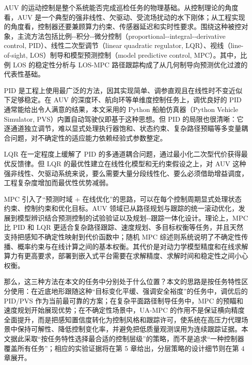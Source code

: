 AUV 的运动控制是整个系统能否完成巡检任务的物理基础。从控制理论的角度看，AUV 是一个典型的强非线性、欠驱动、受流场扰动的水下刚体；从工程实现的角度看，控制器还要兼顾算力约束、传感器延迟和实时性要求。围绕这种被控对象，主流方法包括比例-\/-积分-\/-微分控制（proportional-\/-integral-\/-derivative control, PID）、线性二次型调节（linear quadratic regulator, LQR）、视线（line-of-sight, LOS）制导和模型预测控制（model predictive control, MPC）。其中，比例 LOS 的稳定性分析\cite{fossen2014usges}与 LOS-MPC 路径跟踪\cite{oh2010path}构成了从几何制导向预测优化过渡的代表性基础。

PID 是工程上使用最广泛的方法，因其实现简单、调参直观且在线性时不变近似下足够稳定。在 AUV 的深度环、航向环等单维度控制任务上，调优良好的 PID 通常能给出令人满意的结果，本文采用的 Python 船舶仿真器（Python Vehicle Simulator, PVS）内置自动驾驶仪即基于这种思想。但 PID 的局限也很清晰：它逐通道独立调节，难以显式处理执行器饱和、状态约束、复杂路径预瞄等多变量耦合问题，对不确定性的适应能力依赖经验式参数整定。

LQR 在一定程度上缓解了 PID 的多通道耦合问题，通过最小化二次型代价获得最优反馈律。但 LQR 的最优性建立在线性化模型和无约束假设之上，对 AUV 这种强非线性、欠驱动系统来说，要么需要大量分段线性化、要么必须借助增益调度，工程复杂度增加而最优性优势减弱。

MPC 引入了``预测时域 + 在线优化''的思路，可以在每个控制周期显式处理状态约束、控制约束和优化目标。AUV 领域已从路径规划与跟踪的统一滚动优化\cite{shen2017integrated}，发展到模型辨识结合预测控制的试验验证\cite{zhou2023parameter}以及规划-\/-跟踪一体化设计\cite{deng2024motion}。理论上，MPC 比 PID 和 LQR 更适合复杂路径跟踪、速度规划、多目标权衡等任务，并且天然支持把感知不确定性映射到代价函数中；随机 MPC 综述则系统说明了不确定性传播、概率约束与在线计算之间的基本权衡\cite{mesbah2016stochastic}。其代价是对动力学模型精度和在线求解算力有更高要求，部署到嵌入式平台需要在求解精度、求解时间和稳定性之间小心权衡。

那么，这三种方法在本文的任务中分别处于什么位置？本文的思路是按任务特性区分使用：在近底地形跟随这种``目标变化平缓、强调安全裕度''的任务中，调优后的 PID/PVS 作为当前最可靠的方案；在复杂平面路径制导任务中，MPC 的预瞄和速度规划开始展现优势；在不确定性场景中，UA-MPC 的作用不是保证横向精度全面提升，而是把感知置信度转化为控制风格和跟踪许可，使系统在高压力代理场景中保持可解性、降低控制变化率，并避免把低质量观测误用为连续跟踪证据。本文据此采取``按任务特性选择最合适的控制层级''的策略，而不是追求``一种控制器覆盖所有任务''；相应的实验证据将在第 5 章给出，分层策略的设计细节则在第 4 章展开。

